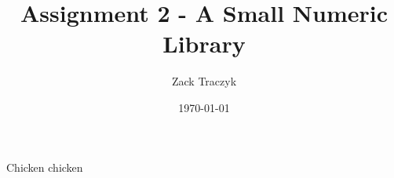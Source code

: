 \documentclass[12pt]{article}
\title{Assignment 2 - A Small Numeric Library}
\author{Zack Traczyk}
\date{\today}
\begin{document}
\maketitle


Chicken chicken
\end{document}
